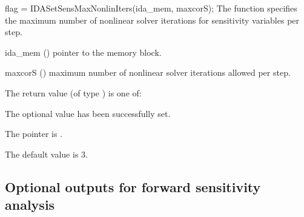
{
  flag = IDASetSensMaxNonlinIters(ida\_mem, maxcorS);
}
{
  The function  specifies the maximum
  number of nonlinear solver iterations for sensitivity variables per step.
}
{
  \begin{args}
  \item[ida\_mem] ()
    pointer to the {\idas} memory block.
  \item[maxcorS] ()
    maximum number of nonlinear solver iterations allowed per step.
  \end{args}
}
{
  The return value  (of type ) is one of:
  \begin{args}
  \item[\Id{IDA\_SUCCESS}] 
    The optional value has been successfully set.
  \item[\Id{IDA\_MEM\_NULL}]
    The  pointer is .
  \end{args}
}
{
  The default value is $3$.
}

\subsection{Optional outputs for forward sensitivity analysis}
\label{ss:sens_optional_output}

